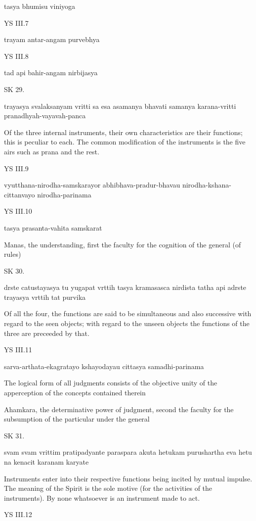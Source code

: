     tasya bhumisu viniyoga

YS III.7

    trayam antar-angam purvebhya

YS III.8

    tad api bahir-angam nirbijasya

SK 29.

trayasya svalaksanyam vritti sa esa asamanya bhavati
samanya karana-vritti pranadhyah-vayavah-panca

Of the three internal instruments,
their own characteristics are their functions;
this is peculiar to each.
The common modification of the instruments is
the five airs such as prana and the rest.

YS III.9

    vyutthana-nirodha-samskarayor abhibhava-pradur-bhavau
    nirodha-kshana-cittanvayo nirodha-parinama

YS III.10

    tasya prasanta-vahita samskarat

    Manas, the understanding, first the faculty for
    the cognition of the general (of rules)

SK 30.

drste catustayasya tu yugapat vrttih tasya kramasasca nirdista
tatha api adrste trayasya vrttih tat purvika

Of all the four, the functions are said to be
simultaneous and also successive
with regard to the seen objects;
with regard to the unseen objects
the functions of the three are preceeded by that.

YS III.11

    sarva-arthata-ekagratayo kshayodayau cittasya samadhi-parinama

    The logical form of all judgments consists of
    the objective unity of the apperception of
    the concepts contained therein

    Ahamkara, the determinative power of judgment,
    second the faculty for the subsumption of
    the particular under the general

SK 31.

svam svam vrittim pratipadyante paraspara akuta hetukam
purushartha eva hetu na kenacit karanam karyate

Instruments enter into their respective functions
being incited by mutual impulse.
The meaning of the Spirit is the sole motive
(for the activities of the instruments).
By none whatsoever is an instrument made to act.

YS III.12

